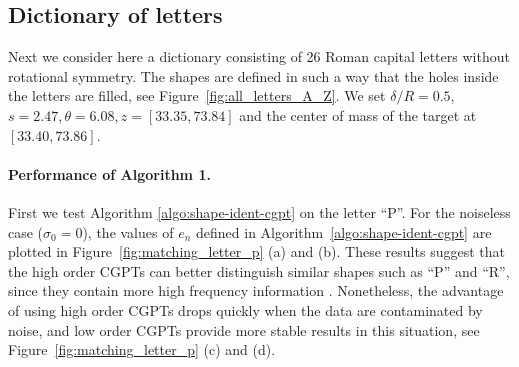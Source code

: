 \subsection{Dictionary of letters}
Next we consider here a dictionary consisting of 26 Roman capital
letters without rotational symmetry. The shapes are defined in
such a way that the holes inside the letters are filled, see
Figure~\ref{fig:all_letters_A_Z}. We set $\delta/R=0.5$, $s= 2.47,
\theta = 6.08, z= [33.35, 73.84]$ and the center of mass of the
target at $[33.40, 73.86]$.

\paragraph{Performance of Algorithm 1.}

First we test Algorithm \ref{algo:shape-ident-cgpt} on the letter
``P''. For the noiseless case ($\sigma_0=0$), the values of $e_n$
defined in Algorithm~\ref{algo:shape-ident-cgpt} are plotted in
Figure~\ref{fig:matching_letter_p} (a) and (b). These results
suggest that the high order CGPTs can better distinguish similar
shapes such as ``P'' and ``R'', since they contain more high
frequency information \cite{AGKLY11}. Nonetheless, the advantage
of using high order CGPTs drops quickly when the data are
contaminated by noise, and low order CGPTs provide more stable
results in this situation, see Figure~\ref{fig:matching_letter_p}
(c) and (d).

